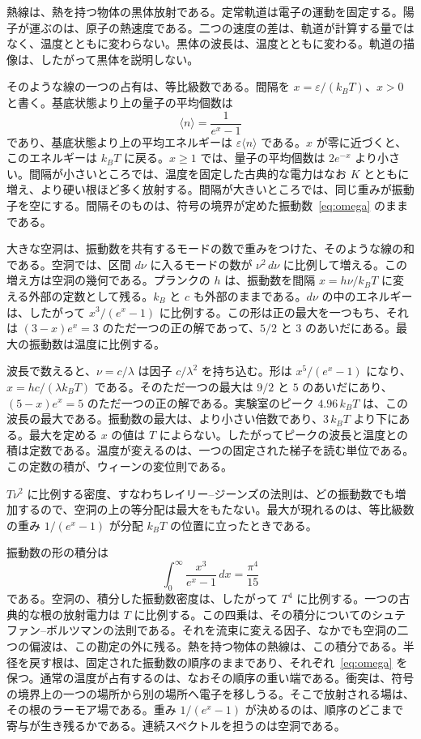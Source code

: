 \documentclass[a4paper]{article}
\begin{document}
熱線は、熱を持つ物体の黒体放射である。定常軌道は電子の運動を固定する。陽子が運ぶのは、原子の熱速度である。二つの速度の差は、軌道が計算する量ではなく、温度とともに変わらない。黒体の波長は、温度とともに変わる。軌道の描像は、したがって黒体を説明しない。

そのような線の一つの占有は、等比級数である。間隔を \(x=\varepsilon/(k_B T)\)、\(x>0\) と書く。基底状態より上の量子の平均個数は
\[
\langle n\rangle=\frac{1}{e^{x}-1}
\]
であり、基底状態より上の平均エネルギーは \(\varepsilon\langle n\rangle\) である。\(x\) が零に近づくと、このエネルギーは \(k_B T\) に戻る。\(x\ge 1\) では、量子の平均個数は \(2e^{-x}\) より小さい。間隔が小さいところでは、温度を固定した古典的な電力はなお \(K\) とともに増え、より硬い根ほど多く放射する。間隔が大きいところでは、同じ重みが振動子を空にする。間隔そのものは、符号の境界が定めた振動数~\eqref{eq:omega} のままである。

大きな空洞は、振動数を共有するモードの数で重みをつけた、そのような線の和である。空洞では、区間 \(d\nu\) に入るモードの数が \(\nu^{2}\,d\nu\) に比例して増える。この増え方は空洞の幾何である。プランクの \(h\) は、振動数を間隔 \(x=h\nu/k_B T\) に変える外部の定数として残る。\(k_B\) と \(c\) も外部のままである。\(d\nu\) の中のエネルギーは、したがって \(x^{3}/(e^{x}-1)\) に比例する。この形は正の最大を一つもち、それは \((3-x)e^{x}=3\) のただ一つの正の解であって、\(5/2\) と \(3\) のあいだにある。最大の振動数は温度に比例する。

波長で数えると、\(\nu=c/\lambda\) は因子 \(c/\lambda^{2}\) を持ち込む。形は \(x^{5}/(e^{x}-1)\) になり、\(x=hc/(\lambda k_B T)\) である。そのただ一つの最大は \(9/2\) と \(5\) のあいだにあり、\((5-x)e^{x}=5\) のただ一つの正の解である。実験室のピーク \(4.96\,k_B T\) は、この波長の最大である。振動数の最大は、より小さい倍数であり、\(3\,k_B T\) より下にある。最大を定める \(x\) の値は \(T\) によらない。したがってピークの波長と温度との積は定数である。温度が変えるのは、一つの固定された梯子を読む単位である。この定数の積が、ウィーンの変位則である。

\(T\nu^{2}\) に比例する密度、すなわちレイリー--ジーンズの法則は、どの振動数でも増加するので、空洞の上の等分配は最大をもたない。最大が現れるのは、等比級数の重み \(1/(e^{x}-1)\) が分配 \(k_B T\) の位置に立ったときである。

振動数の形の積分は
\[
\int_{0}^{\infty}\frac{x^{3}}{e^{x}-1}\,dx=\frac{\pi^{4}}{15}
\]
である。空洞の、積分した振動数密度は、したがって \(T^{4}\) に比例する。一つの古典的な根の放射電力は \(T\) に比例する。この四乗は、その積分についてのシュテファン--ボルツマンの法則である。それを流束に変える因子、なかでも空洞の二つの偏波は、この勘定の外に残る。熱を持つ物体の熱線は、この積分である。半径を戻す根は、固定された振動数の順序のままであり、それぞれ~\eqref{eq:omega} を保つ。通常の温度が占有するのは、なおその順序の重い端である。衝突は、符号の境界上の一つの場所から別の場所へ電子を移しうる。そこで放射される場は、その根のラーモア場である。重み \(1/(e^{x}-1)\) が決めるのは、順序のどこまで寄与が生き残るかである。連続スペクトルを担うのは空洞である。
\end{document}
